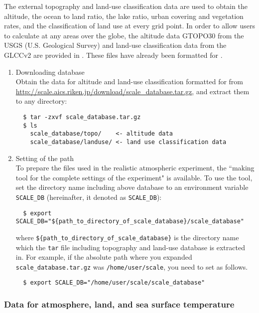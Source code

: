 The external topography and land-use classification data are used to obtain 
the altitude, the ocean to land ratio, the lake ratio, urban covering and vegetation rates, and the classification of land use at every grid point.
In order to allow users to calculate at any areas over the globe,
the altitude data GTOPO30 from the USGS (U.S. Geological Survey)
and land-use classification data from the GLCCv2 are provided in \scalerm.
These files have already been formatted for \scalerm.
\begin{enumerate}
\item Downloading database\\
Obtain the data for altitude and land-use classification formatted for \scalerm  from \url{http://scale.aics.riken.jp/download/scale_database.tar.gz}, and extract them to any directory:
\begin{verbatim}
  $ tar -zxvf scale_database.tar.gz
  $ ls
    scale_database/topo/    <- altitude data
    scale_database/landuse/ <- land use classification data
\end{verbatim}
\item Setting of the path\\
To prepare the files used in the realistic atmospheric experiment,
the ``making tool for the complete settings of the experiment" is available.
To use the tool, set the directory name including above database 
to an environment variable \verb|SCALE_DB| (hereinafter, it denoted as \verb|SCALE_DB|):
\begin{verbatim}
  $ export SCALE_DB="${path_to_directory_of_scale_database}/scale_database"
\end{verbatim}
where \verb|${path_to_directory_of_scale_database}| is the directory name 
which the \verb|tar| file including topography and land-use database is extracted in. 
For example, if the absolute path where you expanded \verb|scale_database.tar.gz| 
was \verb|/home/user/scale|, you need to set as follows.
\begin{verbatim}
  $ export SCALE_DB="/home/user/scale/scale_database"
\end{verbatim}

\end{enumerate}


\subsubsection{Data for atmosphere, land, and sea surface temperature}

